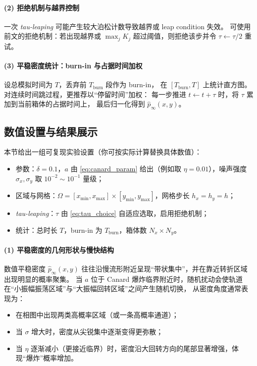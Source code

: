 	\paragraph{(2) 拒绝机制与越界控制}
	一次 \textit{tau-leaping} 可能产生较大泊松计数导致越界或 leap condition 失效。
	可使用前文的拒绝机制：若出现越界或 \(\max_j K_j\) 超过阈值，则拒绝该步并令 \(\tau\leftarrow \tau/2\) 重试。
	
	\paragraph{(3) 平稳密度统计：burn-in 与占据时间加权}
	设总模拟时间为 \(T\)，丢弃前 \(T_{\mathrm{burn}}\) 段作为 burn-in，
	在 \([T_{\mathrm{burn}},T]\) 上统计直方图。
	对连续时间跳过程，更推荐以“停留时间”加权：
	每一步推进 \(t\leftarrow t+\tau\) 时，将 \(\tau\) 累加到当前箱体的占据时间上，
	最后归一化得到 \(\hat p_\infty(x,y)\)。
	
	\subsection{数值设置与结果展示}
	
	本节给出一组可复现实验设置（你可按实际计算替换具体数值）：
	\begin{itemize}
		\item 参数：\(\delta=0.1\)，\(a\) 由 \eqref{eq:canard_param} 给出（例如取 \(\eta=0.01\)），噪声强度 \(\sigma_x,\sigma_y\) 取 \(10^{-2}\sim 10^{-1}\) 量级；
		\item 区域与网格：\(\Omega=[x_{\min},x_{\max}]\times[y_{\min},y_{\max}]\)，网格步长 \(h_x=h_y=h\)；
		\item \textit{tau-leaping}：\(\tau\) 由 \eqref{eq:tau_choice} 自适应选取，启用拒绝机制；
		\item 统计：总时长 \(T\)，burn-in 为 \(T_{\mathrm{burn}}\)，箱体数 \(N_x\times N_y\)。
	\end{itemize}
	
	\paragraph{(1) 平稳密度的几何形状与慢快结构}
	数值平稳密度 \(\hat p_\infty(x,y)\) 往往沿慢流形附近呈现“带状集中”，并在靠近转折区域出现明显的概率聚集。
	当 \(a\) 位于 Canard 爆炸临界附近时，随机扰动会使轨道在“小振幅振荡区域”与“大振幅回转区域”之间产生随机切换，
	从密度角度通常表现为：
	\begin{itemize}
		\item 在相图中出现两类高概率区域（或一条高概率通道）；
		\item 当 \(\sigma\) 增大时，密度从尖锐集中逐渐变得更弥散；
		\item 当 \(\eta\) 逐渐减小（更接近临界）时，密度沿大回转方向的尾部显著增强，体现“爆炸”概率增加。
	\end{itemize}
	
